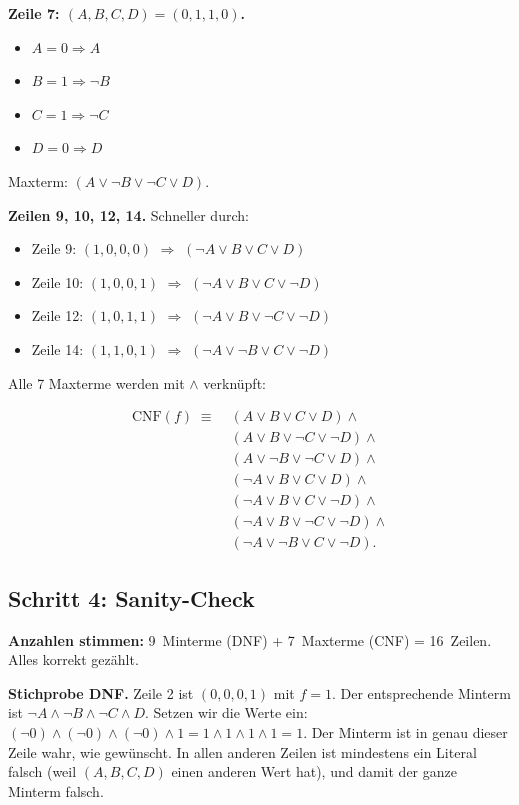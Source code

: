\documentclass[a4paper,12pt]{article}
\begin{document}
\textbf{Zeile 7: $(A,B,C,D) = (0,1,1,0)$.}
\begin{itemize}[nosep]
\item $A = 0 \Rightarrow A$
\item $B = 1 \Rightarrow \neg B$
\item $C = 1 \Rightarrow \neg C$
\item $D = 0 \Rightarrow D$
\end{itemize}
Maxterm: $(A \vee \neg B \vee \neg C \vee D)$.

\textbf{Zeilen 9, 10, 12, 14.} Schneller durch:
\begin{itemize}[nosep]
\item Zeile 9: $(1,0,0,0)$ $\Rightarrow$ $(\neg A \vee B \vee C \vee D)$
\item Zeile 10: $(1,0,0,1)$ $\Rightarrow$ $(\neg A \vee B \vee C \vee \neg D)$
\item Zeile 12: $(1,0,1,1)$ $\Rightarrow$ $(\neg A \vee B \vee \neg C \vee \neg D)$
\item Zeile 14: $(1,1,0,1)$ $\Rightarrow$ $(\neg A \vee \neg B \vee C \vee \neg D)$
\end{itemize}

Alle 7 Maxterme werden mit $\wedge$ verkn\"upft:

\begin{merkbox}[title={Ergebnis: CNF}]
\begin{align*}
\text{CNF}(f) \;\equiv\; &(A \vee B \vee C \vee D) \wedge {} \\
& (A \vee B \vee \neg C \vee \neg D) \wedge {} \\
& (A \vee \neg B \vee \neg C \vee D) \wedge {} \\
& (\neg A \vee B \vee C \vee D) \wedge {} \\
& (\neg A \vee B \vee C \vee \neg D) \wedge {} \\
& (\neg A \vee B \vee \neg C \vee \neg D) \wedge {} \\
& (\neg A \vee \neg B \vee C \vee \neg D).
\end{align*}
\end{merkbox}

\subsection*{Schritt 4: Sanity-Check}

\textbf{Anzahlen stimmen:} 9~Minterme (DNF) + 7~Maxterme (CNF) =
16~Zeilen. Alles korrekt gez\"ahlt.

\textbf{Stichprobe DNF.} Zeile 2 ist $(0,0,0,1)$ mit $f = 1$. Der
entsprechende Minterm ist $\neg A \wedge \neg B \wedge \neg C \wedge D$.
Setzen wir die Werte ein:
$(\neg 0) \wedge (\neg 0) \wedge (\neg 0) \wedge 1 =
1 \wedge 1 \wedge 1 \wedge 1 = 1$. Der Minterm ist in genau dieser
Zeile wahr, wie gew\"unscht. In allen anderen Zeilen ist mindestens
ein Literal falsch (weil $(A,B,C,D)$ einen anderen Wert hat), und
damit der ganze Minterm falsch.
\end{document}
